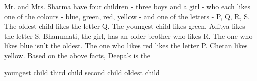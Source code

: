 \documentclass[12pt,answers]{exam}
\begin{document}
\begin{questions}
\question Mr. and Mrs. Sharma have four children - three boys and a girl - who each likes one of the colours - blue, green, red, yellow - and one of the letters - P, Q, R, S. The oldest child likes the letter Q. The youngest child likes green. Aditya likes the letter S. Bhanumati, the girl, has an older brother who likes R. The one who likes blue isn't the oldest. The one who likes red likes the letter P. Chetan likes yellow. Based on the above facts, Deepak is the
\begin{choices}
    \choice youngest child
    \choice third child
    \CorrectChoice second child
    \choice oldest child
\end{choices}


\end{questions}
\end{document}
